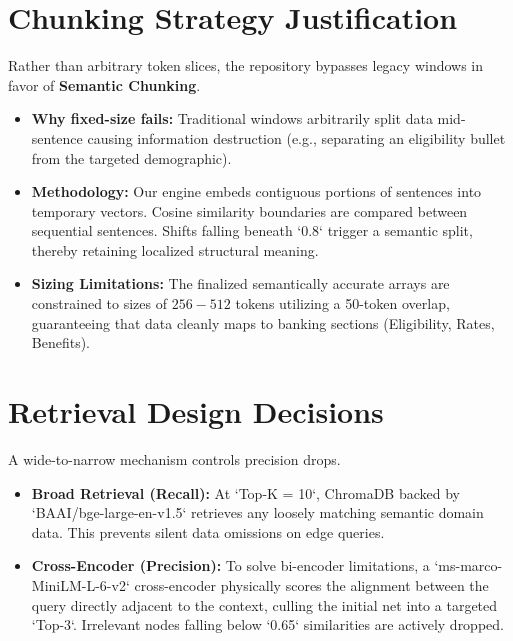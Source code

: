 \documentclass[11pt,a4paper]{article}
\begin{document}
\section{Chunking Strategy Justification}
Rather than arbitrary token slices, the repository bypasses legacy windows in favor of \textbf{Semantic Chunking}.
\begin{itemize}
    \item \textbf{Why fixed-size fails:} Traditional windows arbitrarily split data mid-sentence causing information destruction (e.g., separating an eligibility bullet from the targeted demographic).
    \item \textbf{Methodology:} Our engine embeds contiguous portions of sentences into temporary vectors. Cosine similarity boundaries are compared between sequential sentences. Shifts falling beneath `0.8` trigger a semantic split, thereby retaining localized structural meaning.
    \item \textbf{Sizing Limitations:} The finalized semantically accurate arrays are constrained to sizes of $256 - 512$ tokens utilizing a 50-token overlap, guaranteeing that data cleanly maps to banking sections (Eligibility, Rates, Benefits).
\end{itemize}

\section{Retrieval Design Decisions}
A wide-to-narrow mechanism controls precision drops.
\begin{itemize}
    \item \textbf{Broad Retrieval (Recall):} At `Top-K = 10`, ChromaDB backed by `BAAI/bge-large-en-v1.5` retrieves any loosely matching semantic domain data. This prevents silent data omissions on edge queries.
    \item \textbf{Cross-Encoder (Precision):} To solve bi-encoder limitations, a `ms-marco-MiniLM-L-6-v2` cross-encoder physically scores the alignment between the query directly adjacent to the context, culling the initial net into a targeted `Top-3`. Irrelevant nodes falling below `0.65` similarities are actively dropped.
\end{itemize}
\end{document}
